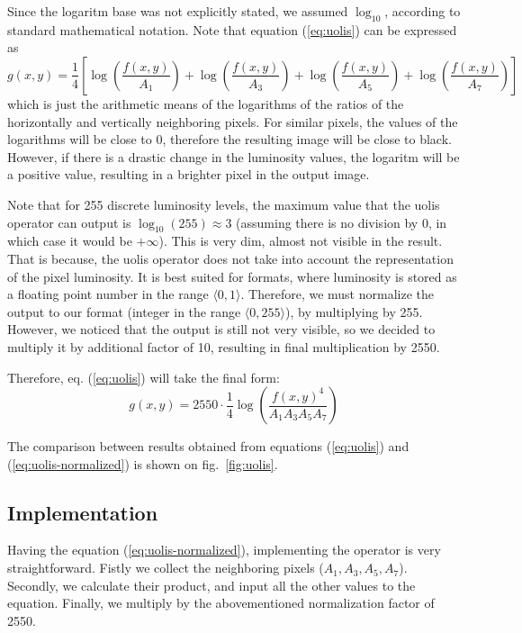 \documentclass[12pt]{article}
\begin{document}
Since the logaritm base was not explicitly stated, we assumed $\log_{10}$, according to standard mathematical notation.
Note that equation (\ref{eq:uolis}) can be expressed as
\begin{equation*}
    g(x,y) = \frac{1}{4} \left[
        \log\left(\frac{f(x,y)}{A_1}\right) +
        \log\left(\frac{f(x,y)}{A_3}\right) +
        \log\left(\frac{f(x,y)}{A_5}\right) +
        \log\left(\frac{f(x,y)}{A_7}\right)
    \right]
\end{equation*}
which is just the arithmetic means of the logarithms of the ratios of the horizontally and vertically neighboring pixels.
For similar pixels, the values of the logarithms will be close to 0, therefore the resulting image will be close to black.
However, if there is a drastic change in the luminosity values, the logaritm will be a positive value, resulting in a brighter pixel in the output image.

Note that for 255 discrete luminosity levels, the maximum value that the uolis operator can output is $\log_{10}(255) \approx 3$ (assuming there is no division by 0, in which case it would be $+\infty$).
This is very dim, almost not visible in the result.
That is because, the uolis operator does not take into account the representation of the pixel luminosity.
It is best suited for formats, where luminosity is stored as a floating point number in the range $\langle 0, 1 \rangle$.
Therefore, we must normalize the output to our format (integer in the range $\langle 0, 255 \rangle$), by multiplying by 255.
However, we noticed that the output is still not very visible, so we decided to multiply it by additional factor of 10, resulting in final multiplication by 2550.

Therefore, eq. (\ref{eq:uolis}) will take the final form:
\begin{equation}
    g(x,y) = 2550 \cdot \frac{1}{4} \log \left(
        \frac{f(x,y)^4}{A_1 A_3 A_5 A_7}
    \right)
    \label{eq:uolis-normalized}
\end{equation}

The comparison between results obtained from equations (\ref*{eq:uolis}) and (\ref*{eq:uolis-normalized}) is shown on fig.~\ref{fig:uolis}.

\pagebreak[3]
\subsection{Implementation}

Having the equation (\ref{eq:uolis-normalized}), implementing the operator is very straightforward.
Fistly we collect the neighboring pixels ($A_1,A_3,A_5,A_7$).
Secondly, we calculate their product, and input all the other values to the equation.
Finally, we multiply by the abovementioned normalization factor of 2550.
\end{document}
